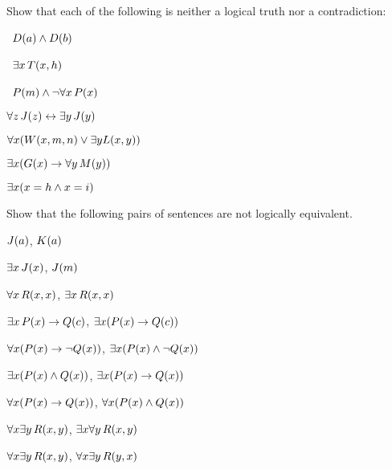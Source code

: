 \solutions
\problempart
\label{pr.Contingent}
Show that each of the following is neither a logical truth nor a contradiction:
\begin{earg}
\item \leftsolutions\ $\mathord{D}(a) \wedge \mathord{D}(b)$
\item \leftsolutions\ $\exists x\,\mathord{T}(x,h)$
\item \leftsolutions\ $\mathord{P}(m) \wedge \neg\forall x\,\mathord{P}(x)$
\item $\forall z\, \mathord{J}(z) \leftrightarrow \exists y\,\mathord{J}(y)$
\item $\forall x (\mathord{W}(x,m,n) \vee \exists y\mathord{L}(x,y))$
\item $\exists x (\mathord{G}(x) \rightarrow \forall y\,\mathord{M}(y))$
\item $\exists x (x = h \wedge x = i)$
\end{earg}

\solutions
\problempart
\label{pr.NotEquiv}
Show that the following pairs of sentences are not logically equivalent.
\begin{earg}
\item $\mathord{J}(a)$, $\mathord{K}(a)$
\item $\exists x\,\mathord{J}(x)$, $\mathord{J}(m)$
\item $\forall x\,\mathord{R}(x,x)$, $\exists x\,\mathord{R}(x,x)$
\item $\exists x\,\mathord{P}(x) \rightarrow \mathord{Q}(c)$, $\exists x (\mathord{P}(x) \rightarrow \mathord{Q}(c))$
\item $\forall x(\mathord{P}(x) \rightarrow \neg \mathord{Q}(x))$, $\exists x(\mathord{P}(x) \wedge \neg \mathord{Q}(x))$
\item $\exists x(\mathord{P}(x) \wedge \mathord{Q}(x))$, $\exists x(\mathord{P}(x) \rightarrow \mathord{Q}(x))$
\item $\forall x(\mathord{P}(x)\rightarrow \mathord{Q}(x))$, $\forall x(\mathord{P}(x) \wedge \mathord{Q}(x))$
\item $\forall x\exists y\,\mathord{R}(x,y)$, $\exists x\forall y\,\mathord{R}(x,y)$
\item $\forall x\exists y\,\mathord{R}(x,y)$, $\forall x\exists y\,\mathord{R}(y,x)$
\end{earg}



